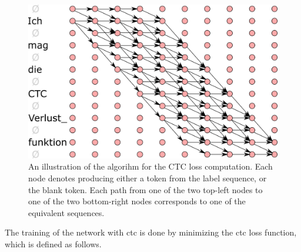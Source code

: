 \begin{figure}
  \centering

  \includegraphics[width=12cm]{img/ctc_schema.png}

  \caption{An illustration of the algorihm for the CTC loss computation. Each
    node denotes producing either a token from the label sequence, or the blank
    token. Each path from one of the two top-left nodes to one of the two
    bottom-right nodes corresponds to one of the equivalent sequences.  }
  \label{fig:ctc-dynamic-programming}
\end{figure}


The training of the network with \gls{ctc} is done
by minimizing the \gls{ctc} loss function, which is defined as follows.



